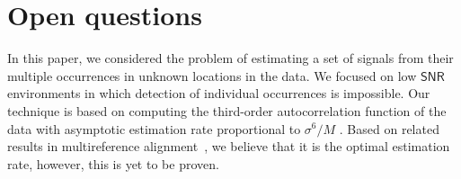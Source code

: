\documentclass[english,11pt]{article}
\newcommand{\TODO}[1]{{\color{red}{[#1]}}}
\numberwithin{equation}{section}
\theoremstyle{plain}
\theoremstyle{definition}
\theoremstyle{remark}
\theoremstyle{plain}
\theoremstyle{remark}
\theoremstyle{plain}
\theoremstyle{plain}
\newcommand{\SNR}{{\textsf{SNR}}}
\begin{document}
\TODO{TB: 2D experiment?}

%
%
% 

\section{Open questions}

In this paper, we considered the problem of estimating a set of signals from their multiple occurrences in unknown locations in the data.  We focused on  low $\SNR$ environments in which detection of individual occurrences is impossible. 
Our technique  is based on computing the third-order autocorrelation function of the data with asymptotic estimation rate proportional to $\sigma^6/M$ \TODO{TB: it's not clear to me yet whether we discuss the estimation rate in the paper}. Based on related results in multireference alignment~\cite{abbe2018estimation}, we believe that it is the optimal estimation rate, however, this is yet to be proven.
\end{document}
